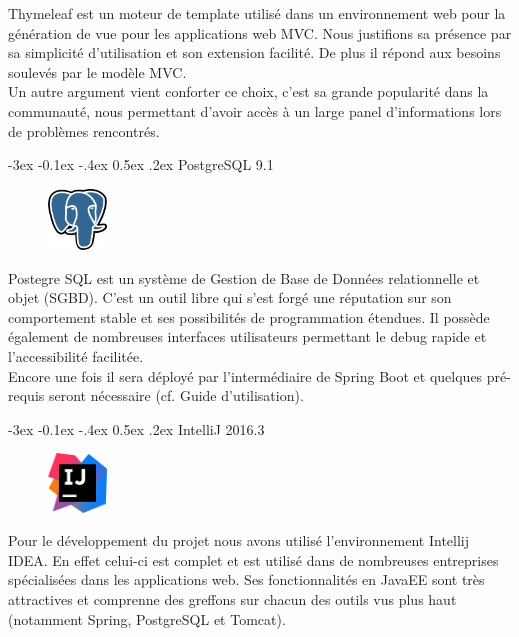 \documentclass[a4paper]{article}
\makeatletter
\renewcommand{\subsection}{\@startsection {subsection}{2}{\z@}
{-3ex \@plus -0.1ex \@minus -.4ex}
{0.5ex \@plus.2ex }
{\normalfont\sffamily\bfseries}}
\makeatother
\begin{document}
Thymeleaf est un moteur de template utilisé dans un environnement web pour la génération de vue pour les applications web MVC. Nous justifions sa présence par sa simplicité d'utilisation et son extension facilité. De plus il répond aux besoins soulevés par le modèle MVC.\\
Un autre argument vient conforter ce choix, c'est sa grande popularité dans la communauté, nous permettant d'avoir accès à un large panel d'informations lors de problèmes rencontrés.

\subsection{PostgreSQL 9.1}
\begin{figure}
\centering
\includegraphics[width=0.14\textwidth]{resources/postgresql.png}
\end{figure}
Postegre SQL est un système de Gestion de Base de Données relationnelle et objet (SGBD). C'est un outil libre qui s'est forgé une réputation sur son comportement stable et ses possibilités de programmation étendues. Il possède également de nombreuses interfaces utilisateurs permettant le debug rapide et l'accessibilité facilitée.\\
Encore une fois il sera déployé par l'intermédiaire de Spring Boot et quelques pré-requis seront nécessaire (cf. Guide d'utilisation).

\subsection{IntelliJ 2016.3}
\begin{figure}
\centering
\includegraphics[width=0.14\textwidth]{resources/intellij.png}
\end{figure}
Pour le développement du projet nous avons utilisé l'environnement Intellij IDEA. En effet celui-ci est complet et est utilisé dans de nombreuses entreprises spécialisées dans les applications web. Ses fonctionnalités en JavaEE sont très attractives et comprenne des greffons sur chacun des outils vus plus haut (notamment Spring, PostgreSQL et Tomcat).
\end{document}
